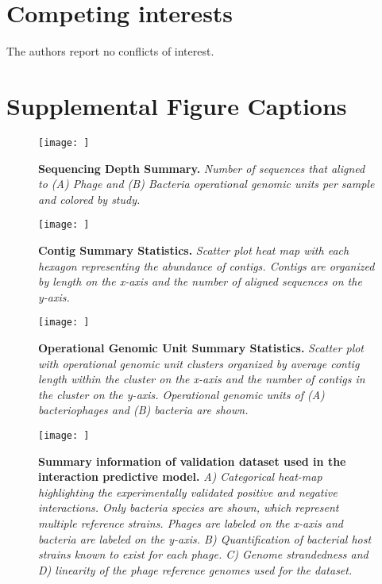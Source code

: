 \documentclass[12pt,]{article}
\newcommand{\beginsupplement}{%
        \setcounter{table}{0}
        \renewcommand{\thetable}{S\arabic{table}}%
        \setcounter{figure}{0}
        \renewcommand{\thefigure}{S\arabic{figure}}%
     }
\begin{document}
\section{Competing interests}\label{competing-interests}

The authors report no conflicts of interest.

\newpage

\section{Supplemental Figure
Captions}\label{supplemental-figure-captions}

\beginsupplement

\begin{figure}[htbp]
\centering
\texttt{[image: ]}
\caption{\textbf{Sequencing Depth Summary.} \emph{Number of sequences
that aligned to (A) Phage and (B) Bacteria operational genomic units per
sample and colored by study.}\label{SequenceStats}}
\end{figure}

\newpage

\begin{figure}[htbp]
\centering
\texttt{[image: ]}
\caption{\textbf{Contig Summary Statistics.} \emph{Scatter plot heat map
with each hexagon representing the abundance of contigs. Contigs are
organized by length on the x-axis and the number of aligned sequences on
the y-axis.}\label{ContigStats}}
\end{figure}

\newpage

\begin{figure}[htbp]
\centering
\texttt{[image: ]}
\caption{\textbf{Operational Genomic Unit Summary Statistics.}
\emph{Scatter plot with operational genomic unit clusters organized by
average contig length within the cluster on the x-axis and the number of
contigs in the cluster on the y-axis. Operational genomic units of (A)
bacteriophages and (B) bacteria are shown.}\label{ClusterStats}}
\end{figure}

\newpage

\begin{figure}[htbp]
\centering
\texttt{[image: ]}
\caption{\textbf{Summary information of validation dataset used in the
interaction predictive model.} \emph{A) Categorical heat-map
highlighting the experimentally validated positive and negative
interactions. Only bacteria species are shown, which represent multiple
reference strains. Phages are labeled on the x-axis and bacteria are
labeled on the y-axis. B) Quantification of bacterial host strains known
to exist for each phage. C) Genome strandedness and D) linearity of the
phage reference genomes used for the
dataset.}\label{ValidationOverview}}
\end{figure}
\end{document}
